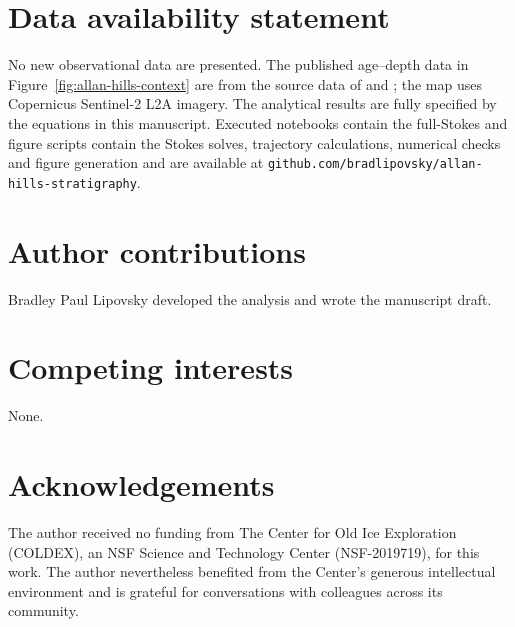 \documentclass[review]{igs}
\providecommand{\DIFadd}[1]{{\protect\color{blue} \sf #1}} %
\providecommand{\DIFdel}[1]{{\protect\color{red} \scriptsize #1}} %
\providecommand{\DIFaddbegin}{} %
\providecommand{\DIFaddend}{} %
\providecommand{\DIFdelbegin}{} %
\providecommand{\DIFdelend}{} %
\newcommand{\DIFscaledelfig}{0.5}
\newlength{\DIFdelgraphicswidth} %
\newlength{\DIFdelgraphicsheight} %
\newcommand{\DIFaddincludegraphics}[2][]{{\color{blue}\fbox{\DIFOincludegraphics[#1]{#2}}}} %
\newcommand{\DIFdelincludegraphics}[2][]{%
\sbox{\DIFdelgraphicsbox}{\DIFOincludegraphics[#1]{#2}}%
\settoboxwidth{\DIFdelgraphicswidth}{\DIFdelgraphicsbox} %
\settoboxtotalheight{\DIFdelgraphicsheight}{\DIFdelgraphicsbox} %
\scalebox{\DIFscaledelfig}{%
\parbox[b]{\DIFdelgraphicswidth}{\usebox{\DIFdelgraphicsbox}\\[-\baselineskip] \rule{\DIFdelgraphicswidth}{0em}}\llap{\resizebox{\DIFdelgraphicswidth}{\DIFdelgraphicsheight}{%
\setlength{\unitlength}{\DIFdelgraphicswidth}%
\begin{picture}(1,1)%
\thicklines\linethickness{2pt} %
{\color[rgb]{1,0,0}\put(0,0){\framebox(1,1){}}}%
{\color[rgb]{1,0,0}\put(0,0){\line( 1,1){1}}}%
{\color[rgb]{1,0,0}\put(0,1){\line(1,-1){1}}}%
\end{picture}%
}\hspace*{3pt}}} %
} %
\DeclareRobustCommand{\DIFaddbegin}{\DIFOaddbegin \let\includegraphics\DIFaddincludegraphics} %
\DeclareRobustCommand{\DIFaddend}{\DIFOaddend \let\includegraphics\DIFOincludegraphics} %
\DeclareRobustCommand{\DIFdelbegin}{\DIFOdelbegin \let\includegraphics\DIFdelincludegraphics} %
\DeclareRobustCommand{\DIFdelend}{\DIFOaddend \let\includegraphics\DIFOincludegraphics} %
\begin{document}
\section*{Data availability statement}
No new observational data are presented. The \DIFaddbegin \DIFadd{published age--depth data in Figure~\ref{fig:allan-hills-context} are from the source data of \citet{Shackleton2025} and \citet{MarksPeterson2026}; the map uses Copernicus Sentinel-2 L2A imagery. The }\DIFaddend analytical results are fully specified by the equations in this manuscript. Executed notebooks \DIFdelbegin \DIFdel{contain the full-Stokes }\DIFdelend \DIFaddbegin \DIFadd{and figure scripts contain the Stokes }\DIFaddend solves, trajectory calculations, numerical checks and figure generation and are available at \texttt{github.com/bradlipovsky/allan-hills-stratigraphy}.

\section*{Author contributions}
Bradley Paul Lipovsky developed the analysis and wrote the manuscript draft.

\section*{Competing interests}
None.

\section*{Acknowledgements}
The author received no funding from The Center for Old Ice Exploration (COLDEX), an NSF Science and Technology Center (NSF-2019719), for this work. The author nevertheless benefited from the Center's generous intellectual environment and is grateful for conversations with colleagues across its community.
\end{document}
